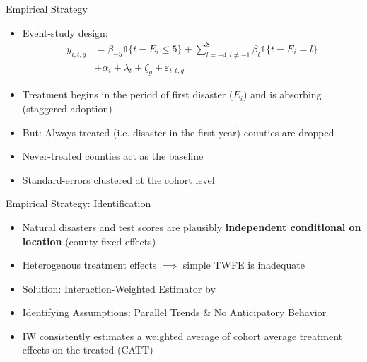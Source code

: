 \documentclass[hyperref={colorlinks = true,linkcolor = blue, citecolor=blue,urlcolor=blue}]{beamer}
\begin{document}
\begin{frame}{Empirical Strategy}
	\begin{itemize}
		\item Event-study design:
		\begin{align*}
			y_{i, t, g} &= \beta_{-5}  \mathds{1}\{t - E_i \leq 5\} + \sum_{l = -4, l \neq -1}^{8} \beta_l \mathds{1}\{t - E_i = l\} \\ &+ \alpha_i + \lambda_t + \zeta_g + \varepsilon_{i, t, g}
		\end{align*}
		\item Treatment begins in the period of first disaster ($E_i$) and is absorbing (staggered adoption)
		\item But: Always-treated (i.e. disaster in the first year) counties are dropped
		\item Never-treated counties act as the baseline
		\item Standard-errors clustered at the cohort level \citep{Abadie_2017}
	\end{itemize}
\end{frame}

\begin{frame}{Empirical Strategy: Identification}
	\begin{itemize}
		\item Natural disasters and test scores are plausibly \textbf{independent conditional on location} (county fixed-effects)
		\item Heterogenous treatment effects $\implies$ simple TWFE is inadequate \citep{deChaisemartin_2020, Sun_2021}
		\item Solution: Interaction-Weighted Estimator by \cite{Sun_2021}
		\item Identifying Assumptions: Parallel Trends \& No Anticipatory Behavior
		\item IW consistently estimates a weighted average of cohort average treatment effects on the treated (CATT)
	\end{itemize}
\end{frame}
\end{document}
